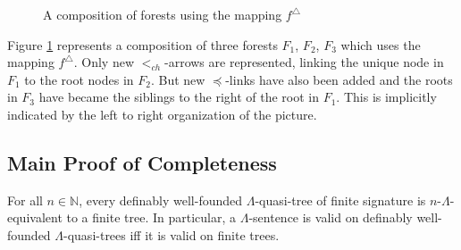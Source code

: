 \documentclass{LMCS}
\begin{document}
\begin{figure}[!h]
\begin{center}
\caption{A composition of forests using the mapping $f^\triangle$}\label{compforest} \label{jolidessin}
  \end{center}
\end{figure}

Figure \ref{jolidessin} represents a composition of three forests $F_1$, $F_2$, $F_3$ which uses the mapping $f^\triangle$. Only new $<_{ch}$-arrows are represented, linking the unique node in $F_1$ to the root nodes in $F_2$. But new $\preceq$-links have also been added and the roots in $F_3$ have became the siblings to the right of the root in $F_1$. This is implicitly indicated by the left to right organization of the picture. 






\subsection{Main Proof of Completeness}
\label{sectproof}


\begin{lem}
  For all $n\in\mathbb{N}$, every definably well-founded $\Lambda$-quasi-tree of
  finite signature is $n$-$\Lambda$-equivalent to a finite tree. In particular,
  a $\Lambda$-sentence is valid on definably well-founded $\Lambda$-quasi-trees iff it is
  valid on finite trees.
\label{lemma3}
\end{lem}
\end{document}
